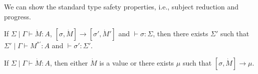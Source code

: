 We can show the standard type safety properties, i.e., subject reduction and progress.
\begin{thm}
  If $\Sigma\mid\Gamma \vdash \dot{M} : A$, $[\sigma,\dot{M}] \to [\sigma',\dot{M}']$ and $\vdash \sigma : \Sigma$,
  then there exists $\Sigma'$ such that $\Sigma' \mid \Gamma \vdash M^{*'} : A$ and $\vdash \sigma' : \Sigma'$.
\end{thm}

\begin{thm}[Progress]
  If $\Sigma \mid \Gamma \vdash \dot{M} : A$,
  then either $\dot{M}$ is a value or there exists $\mu$ such that $[\sigma,\dot{M}] \to \mu$.

\end{thm}

